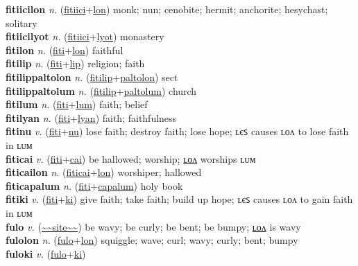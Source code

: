 \textbf{fitiicilon} \textit{n.} (\hyperref[fitiici]{fitiici}+\hyperref[lon]{lon})
monk; nun; cenobite; hermit; anchorite; hesychast; solitary \label{fitiicilon} \\
\textbf{fitiicilyot} \textit{n.} (\hyperref[fitiici]{fitiici}+\hyperref[lyot]{lyot})
monastery \label{fitiicilyot} \\
\textbf{fitilon} \textit{n.} (\hyperref[fiti]{fiti}+\hyperref[lon]{lon})
faithful \label{fitilon} \\
\textbf{fitilip} \textit{n.} (\hyperref[fiti]{fiti}+\hyperref[lip]{lip})
religion; faith \label{fitilip} \\
\textbf{fitilippaltolon} \textit{n.} (\hyperref[fitilip]{fitilip}+\hyperref[paltolon]{paltolon})
sect \label{fitilippaltolon} \\
\textbf{fitilippaltolum} \textit{n.} (\hyperref[fitilip]{fitilip}+\hyperref[paltolum]{paltolum})
church \label{fitilippaltolum} \\
\textbf{fitilum} \textit{n.} (\hyperref[fiti]{fiti}+\hyperref[lum]{lum})
faith; belief \label{fitilum} \\
\textbf{fitilyan} \textit{n.} (\hyperref[fiti]{fiti}+\hyperref[lyan]{lyan})
faith; faithfulness \label{fitilyan} \\
\textbf{fitinu} \textit{v.} (\hyperref[fiti]{fiti}+\hyperref[nu]{nu})
lose faith; destroy faith; lose hope; ʟєꜱ causes ʟᴏᴧ to lose faith in ʟᴜᴍ \label{fitinu} \\
\textbf{fiticai} \textit{v.} (\hyperref[fiti]{fiti}+\hyperref[cai]{cai})
be hallowed; worship; \hyperref[fiticailon]{ʟᴏᴧ} worships ʟᴜᴍ \label{fiticai} \\
\textbf{fiticailon} \textit{n.} (\hyperref[fiticai]{fiticai}+\hyperref[lon]{lon})
worshiper; hallowed \label{fiticailon} \\
\textbf{fiticapalum} \textit{n.} (\hyperref[fiti]{fiti}+\hyperref[capalum]{capalum})
holy book \label{fiticapalum} \\
\textbf{fitiki} \textit{v.} (\hyperref[fiti]{fiti}+\hyperref[ki]{ki})
give faith; take faith; build up hope; ʟєꜱ causes ʟᴏᴧ to gain faith in ʟᴜᴍ \label{fitiki} \\
\textbf{fulo} \textit{v.} (\hyperref[site]{\~{}\~{}site\~{}\~{}})
be wavy; be curly; be bent; be bumpy; \hyperref[fulolon]{ʟᴏᴧ} is wavy \label{fulo} \\
\textbf{fulolon} \textit{n.} (\hyperref[fulo]{fulo}+\hyperref[lon]{lon})
squiggle; wave; curl; wavy; curly; bent; bumpy \label{fulolon} \\
\textbf{fuloki} \textit{v.} (\hyperref[fulo]{fulo}+\hyperref[ki]{ki})
